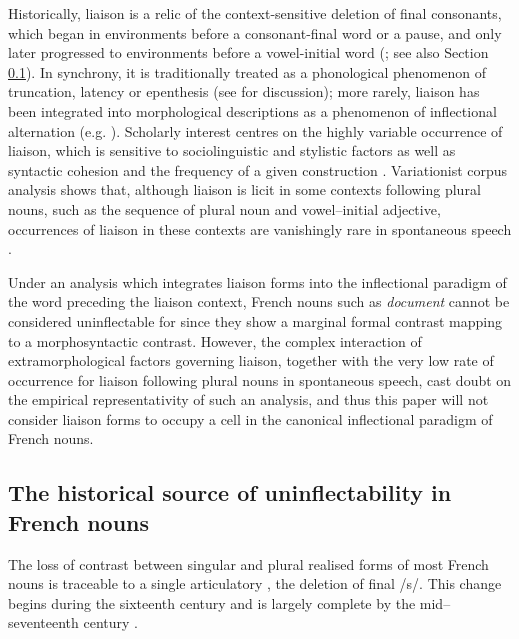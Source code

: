 \documentclass[output=paper,colorlinks,citecolor=brown]{langscibook}
\begin{document}
Historically, liaison is a relic of the context-sensitive deletion of final consonants, which began in environments before a consonant-final word or a pause, and only later progressed to environments before a vowel-initial word (\citealt[222--224]{pope1934}; see also Section \ref{06sec3.6}). In synchrony, it is traditionally treated as a phonological phenomenon of truncation, latency or epenthesis (see \citealt{durandlakscalderonetchobanov2011} for discussion); more rarely, liaison has been integrated into morphological descriptions as a phenomenon of inflectional alternation (e.g. \citealt{bonamiboye2005}). Scholarly interest centres on the highly variable occurrence of liaison, which is sensitive to sociolinguistic and stylistic factors as well as syntactic cohesion and the frequency of a given construction \citep{durandlakscalderonetchobanov2011, durandlyche2016}. Variationist corpus analysis shows that, although liaison is licit in some contexts following plural nouns, such as the sequence of plural noun and vowel--initial adjective, occurrences of liaison in these contexts are vanishingly rare in spontaneous speech \citep{durandlakscalderonetchobanov2011, durandlyche2016}.

Under an analysis which integrates liaison forms into the inflectional paradigm of the word preceding the liaison context, French nouns such as \emph{document} cannot be considered uninflectable for  since they show a marginal formal contrast mapping to a morphosyntactic contrast. However, the complex interaction of extramorphological factors governing liaison, together with the very low rate of occurrence for liaison following plural nouns in spontaneous speech, cast doubt on the empirical representativity of such an analysis, and thus this paper will not consider liaison forms to occupy a cell in the canonical inflectional paradigm of French nouns.

\subsection{The historical source of uninflectability in French nouns} \label{06sec3.6}

The loss of contrast between singular and plural realised forms of most French nouns is traceable to a single articulatory , the deletion of final /s/. This change begins during the sixteenth century and is largely complete by the mid--seventeenth century \citep[222--223]{pope1934}.
\end{document}
